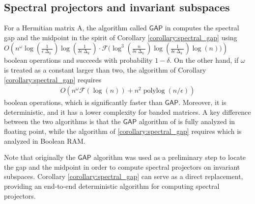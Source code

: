 \documentclass{article}
\newcommand{\lpar}{\left(}
\newcommand{\rpar}{\right)}
\DeclareMathOperator{\polylog}{polylog}
\DeclareMathOperator{\gap}{\Delta}
\newcommand\matA{\boldsymbol{\mathrm{A}}}
\newcommand{\GAP}{\mathsf{GAP}}
\newcommand{\flopcost}{\mathcal{F}}
\begin{document}
\subsection{Spectral projectors and invariant subspaces}
For a Hermitian matrix $\matA$, the algorithm called $\GAP$ in \cite{sobczyk2024invariant} computes the spectral gap and the midpoint in the spirit of Corollary \ref{corollary:spectral_gap} using
$O\lpar n^{\omega}\log(\tfrac{1}{\epsilon\gap_k})\log(\tfrac{1}{\delta\epsilon\gap_k})
\cdot 
\flopcost\Big( 
    \log^3(\tfrac{n}{\delta\epsilon\gap_k})\log(\tfrac{1}{\delta\epsilon\gap_k})\log(n)
\Big)
\rpar$ boolean operations and succeeds with probability $1-\delta$.
On the other hand, if $\omega$ is treated as a constant larger than two, the algorithm of Corollary \ref{corollary:spectral_gap} requires
\begin{align*}
    O\lpar
        n^{\omega}\flopcost(\log(n))
            +
        n^2\polylog(n/\epsilon)
    \rpar
\end{align*}
boolean operations, which is significantly faster than $\GAP$. 
Moreover, it is deterministic, and it has a lower complexity for banded matrices.
A key difference between the two algorithms is that the $\GAP$ algorithm of \cite{sobczyk2024invariant} is fully analyzed in floating point, while the algorithm of \ref{corollary:spectral_gap} requires \cite{bini1998computing} which is analyzed in Boolean RAM.

Note that originally the $\GAP$ algorithm was used as a preliminary step to locate the gap and the midpoint in order to compute spectral projectors on invariant subspaces. Corollary \ref{corollary:spectral_gap} can serve as a direct replacement, providing an end-to-end deterministic algorithm for computing spectral projectors.
\end{document}

